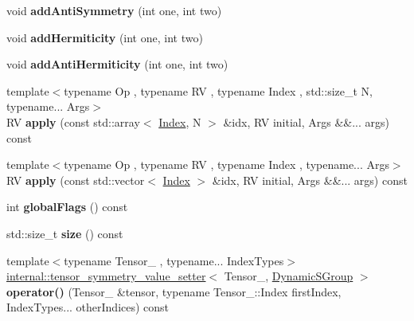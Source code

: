 \begin{DoxyCompactItemize}
void {\bfseries add\+Anti\+Symmetry} (int one, int two)
\item 
\mbox{\label{class_eigen_1_1_dynamic_s_group_a2faa098d02f0715fc82699ec1cf999c1}} 
void {\bfseries add\+Hermiticity} (int one, int two)
\item 
\mbox{\label{class_eigen_1_1_dynamic_s_group_a4391a25c9d7edff1b2806f6f5be3c7b7}} 
void {\bfseries add\+Anti\+Hermiticity} (int one, int two)
\item 
\mbox{\label{class_eigen_1_1_dynamic_s_group_ad201a814e4a7147a044ff104f992d1e7}} 
{\footnotesize template$<$typename Op , typename RV , typename Index , std\+::size\+\_\+t N, typename... Args$>$ }\\RV {\bfseries apply} (const std\+::array$<$ \hyperlink{namespace_eigen_a62e77e0933482dafde8fe197d9a2cfde}{Index}, N $>$ \&idx, RV initial, Args \&\&... args) const
\item 
\mbox{\label{class_eigen_1_1_dynamic_s_group_ae77f8b44a874bcff6c52c1f82cd5a5c2}} 
{\footnotesize template$<$typename Op , typename RV , typename Index , typename... Args$>$ }\\RV {\bfseries apply} (const std\+::vector$<$ \hyperlink{namespace_eigen_a62e77e0933482dafde8fe197d9a2cfde}{Index} $>$ \&idx, RV initial, Args \&\&... args) const
\item 
\mbox{\label{class_eigen_1_1_dynamic_s_group_a8272d8c971713b3e328a13c33ac38b20}} 
int {\bfseries global\+Flags} () const
\item 
\mbox{\label{class_eigen_1_1_dynamic_s_group_acb5356798035ce1ae0d00eec033ef32f}} 
std\+::size\+\_\+t {\bfseries size} () const
\item 
\mbox{\label{class_eigen_1_1_dynamic_s_group_a0d1f3c6ef73e3661a568ce888b6cca58}} 
{\footnotesize template$<$typename Tensor\+\_\+ , typename... Index\+Types$>$ }\\\hyperlink{class_eigen_1_1internal_1_1tensor__symmetry__value__setter}{internal\+::tensor\+\_\+symmetry\+\_\+value\+\_\+setter}$<$ Tensor\+\_\+, \hyperlink{class_eigen_1_1_dynamic_s_group}{Dynamic\+S\+Group} $>$ {\bfseries operator()} (Tensor\+\_\+ \&tensor, typename Tensor\+\_\+\+::\+Index first\+Index, Index\+Types... other\+Indices) const

\end{DoxyCompactItemize}
